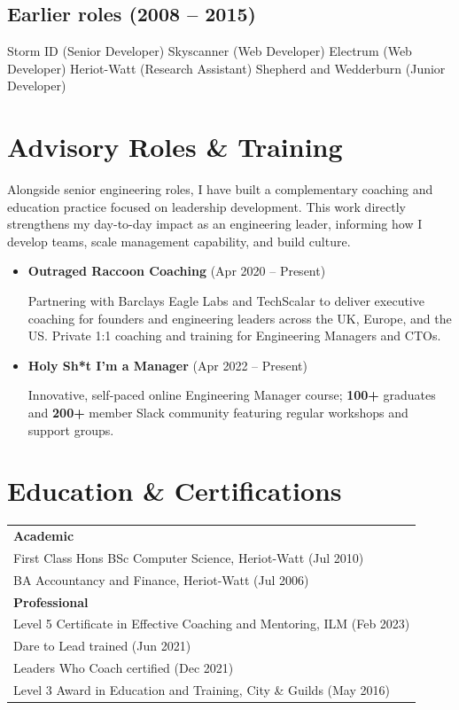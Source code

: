 \documentclass[12pt]{article}
\begin{document}
\subsection*{Earlier roles \small (2008 -- 2015)}
Storm ID (Senior Developer) \textbar{} Skyscanner (Web Developer) \textbar{} Electrum (Web Developer) \textbar{} Heriot-Watt (Research Assistant) \textbar{} Shepherd and Wedderburn (Junior Developer)

\section*{Advisory Roles \& Training}
Alongside senior engineering roles, I have built a complementary coaching and education practice focused on leadership development. This work directly strengthens my day-to-day impact as an engineering leader, informing how I develop teams, scale management capability, and build culture.

\begin{itemize}
    \item \textbf{Outraged Raccoon Coaching\textregistered{}} \small{(Apr 2020 -- Present)} 
    
    Partnering with Barclays Eagle Labs and TechScalar to deliver executive coaching for founders and engineering leaders across the UK, Europe, and the US. Private 1:1 coaching and training for Engineering Managers and CTOs.
    \item \textbf{Holy Sh*t I'm a Manager\texttrademark{}} \small{(Apr 2022 -- Present)} 
    
    Innovative, self-paced online Engineering Manager course; \textbf{100+} graduates and \textbf{200+} member Slack community featuring regular workshops and support groups.
\end{itemize}

\section*{Education \& Certifications}

\begin{tabular}{@{}l@{}}
\textbf{Academic}\\[0.2em]
\quad First Class Hons BSc Computer Science, Heriot-Watt (Jul 2010)\\
\quad BA Accountancy and Finance, Heriot-Watt (Jul 2006)\\[0.6em]
\textbf{Professional}\\[0.2em]
\quad Level 5 Certificate in Effective Coaching and Mentoring, ILM (Feb 2023)\\
\quad Dare to Lead\texttrademark{} trained (Jun 2021)\\
\quad Leaders Who Coach\texttrademark{} certified (Dec 2021)\\
\quad Level 3 Award in Education and Training, City \& Guilds (May 2016)
\end{tabular}
\end{document}
